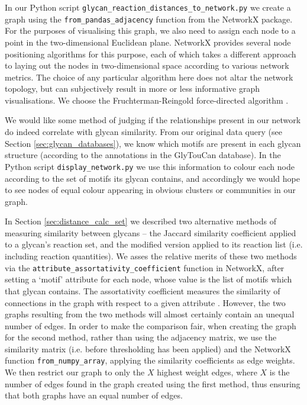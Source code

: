 \documentclass[12pt,a4paper]{article}
\begin{document}
In our Python script \texttt{glycan\_reaction\_distances\_to\_network.py} we create a graph using the \texttt{from\_pandas\_adjacency} function from the NetworkX package. For the purposes of visualising this graph, we also need to assign each node to a point in the two-dimensional Euclidean plane. NetworkX provides several node positioning algorithms for this purpose, each of which takes a different approach to laying out the nodes in two-dimensional space according to various network metrics. The choice of any particular algorithm here does not altar the network topology, but can subjectively result in more or less informative graph visualisations. We choose the Fruchterman-Reingold force-directed algorithm \citep{fruchterman1991graph}.

We would like some method of judging if the relationships present in our network do indeed correlate with glycan similarity. From our original data query (see Section \ref{sec:glycan_databases}), we know which motifs are present in each glycan structure (according to the annotations in the GlyTouCan database). In the Python script \texttt{display\_network.py} we use this information to colour each node according to the set of motifs its glycan contains, and accordingly we would hope to see nodes of equal colour appearing in obvious clusters or communities in our graph.

In Section \ref{sec:distance_calc_set} we described two alternative methods of measuring similarity between glycans -- the Jaccard similarity coefficient applied to a glycan's reaction set, and the modified version applied to its reaction list (i.e. including reaction quantities). We asses the relative merits of these two methods via the \texttt{attribute\_assortativity\_coefficient} function in NetworkX, after setting a `motif' attribute for each node, whose value is the list of motifs which that glycan contains. The assortativity coefficient measures the similarity of connections in the graph with respect to a given attribute \citep{newman2003mixing}. However, the two graphs resulting from the two methods will almost certainly contain an unequal number of edges. In order to make the comparison fair, when creating the graph for the second method, rather than using the adjacency matrix, we use the similarity matrix (i.e. before thresholding has been applied) and the NetworkX function \texttt{from\_numpy\_array}, applying the similarity coefficients as edge weights. We then restrict our graph to only the $X$ highest weight edges, where $X$ is the number of edges found in the graph created using the first method, thus ensuring that both graphs have an equal number of edges.
\end{document}
